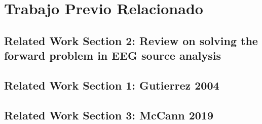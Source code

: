 %
\chapter{Trabajo Previo Relacionado}
\label{sec:related}




\section{Related Work Section 2: Review on solving the forward problem in EEG source analysis}
\label{sec:related:sec2}


\section{Related Work Section 1: Gutierrez 2004}
\label{sec:related:sec1}



\section{Related Work Section 3: McCann 2019}
\label{sec:related:sec3}

